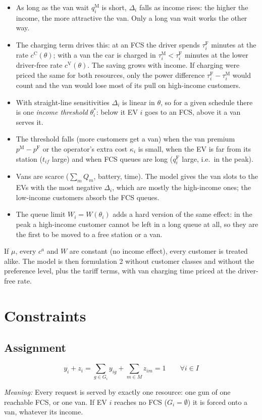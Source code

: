 \documentclass[12pt,a4paper]{article}
\newcommand{\mdesc}[1]{\par{\textit{Meaning:} #1}\par}
\begin{document}
\begin{itemize}[itemsep=1pt]
  \item As long as the van wait $q^{\mathrm M}_i$ is short, $\Delta_i$ falls as income rises: the higher the income, the more attractive the van. Only a long van wait works the other way.
  \item The charging term drives this: at an FCS the driver spends $\tau^{\mathrm F}_i$ minutes at the rate $c^{\mathrm C}(\theta)$; with a van the car is charged in $\tau^{\mathrm M}_i<\tau^{\mathrm F}_i$ minutes at the lower driver-free rate $c^{\mathrm V}(\theta)$. The saving grows with income. If charging were priced the same for both resources, only the power difference $\tau^{\mathrm F}_i-\tau^{\mathrm M}_i$ would count and the van would lose most of its pull on high-income customers.
  \item With straight-line sensitivities $\Delta_i$ is linear in $\theta$, so for a given schedule there is one \emph{income threshold} $\theta^{*}_i$: below it EV $i$ goes to an FCS, above it a van serves it.
  \item The threshold falls (more customers get a van) when the van premium $p^{\mathrm M}-p^{\mathrm F}$ or the operator's extra cost $\kappa_i$ is small, when the EV is far from its station ($t_{if}$ large) and when FCS queues are long ($q^{\mathrm F}_i$ large, i.e.\ in the peak).
  \item Vans are scarce ($\sum_m Q_m$, battery, time). The model gives the van slots to the EVs with the most negative $\Delta_i$, which are mostly the high-income ones; the low-income customers absorb the FCS queues.
  \item The queue limit $W_i=W(\theta_i)$ adds a hard version of the same effect: in the peak a high-income customer cannot be left in a long queue at all, so they are the first to be moved to a free station or a van.
\end{itemize}
If $\mu$, every $c^{a}$ and $W$ are constant (no income effect), every customer is treated alike. The model is then formulation 2 without customer classes and without the preference level, plus the tariff terms, with van charging time priced at the driver-free rate.

\section{Constraints}

\subsection{Assignment}
\begin{equation}
y_i+z_i=\sum_{g\in G_i}y_{ig}+\sum_{m\in M}z_{im}=1\qquad\forall i\in I \label{eq:assign}
\end{equation}
\mdesc{Every request is served by exactly one resource: one gun of one reachable FCS, or one van. If EV $i$ reaches no FCS ($G_i=\emptyset$) it is forced onto a van, whatever its income.}
\end{document}
